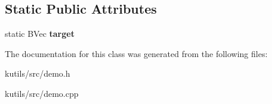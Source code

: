 \subsection*{Static Public Attributes}
\begin{DoxyCompactItemize}
\item 
\hypertarget{class_u_demo_1_1_targeted_b_v_abad5a7740ce9341652ca284d99634f65}{static B\-Vec {\bfseries target}}\label{class_u_demo_1_1_targeted_b_v_abad5a7740ce9341652ca284d99634f65}

\end{DoxyCompactItemize}


The documentation for this class was generated from the following files\-:\begin{DoxyCompactItemize}
\item 
kutils/src/demo.\-h\item 
kutils/src/demo.\-cpp\end{DoxyCompactItemize}
